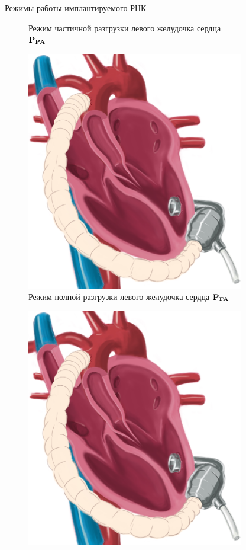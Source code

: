 \documentclass[a4paper, 9pt]{beamer}
\begin{document}
\begin{frame}{Режимы работы имплантируемого РНК}
\begin{minipage}[bht]{0.22\textwidth}
\begin{figure}
	\caption*{\scriptsize Режим частичной разгрузки левого желудочка сердца \\ $\bf P_{PA}$}
\end{figure}
\end{minipage}
\hfill
\begin{minipage}[bht]{0.24\textwidth}
\begin{figure}
	\includegraphics[width=0.85\textwidth]{../images/heart_ps_pres}
	\caption*{\scriptsize Режим полной разгрузки левого желудочка сердца $\bf P_{FA}$}
\end{figure}
\end{minipage}
\hfill
\begin{minipage}[bht]{0.26\textwidth}
\begin{figure}
	\includegraphics[width=0.85\textwidth]{../images/heart_ps_pres}

\end{figure}
\end{minipage}
\end{frame}
\end{document}
